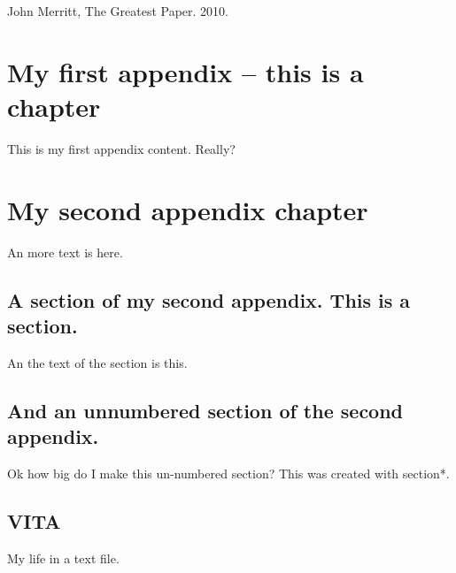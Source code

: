 \documentclass[12pt]{report}
\begin{document}
%
\begin{thebibliography}{JHM}

John Merritt, The Greatest Paper. 2010.
\end{thebibliography}


%
\appendix
\chapter{My first appendix -- this is a chapter}
This is my first appendix content.  Really?
\chapter{My second appendix chapter}
An more text is here.
\section{A section of my second appendix.  This is a section.}
An the text of the section is this.
\section*{And an unnumbered section of the second appendix.}
Ok how big do I make this un-numbered section?
This was created with section*.


\pagebreak{}
\section*{VITA}
My life in a text file.
\end{document}
